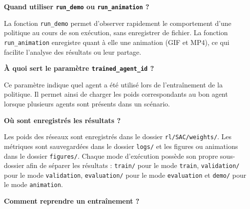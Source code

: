 \vspace{10pt}

\noindent \textbf{Quand utiliser \texttt{run\_demo} ou \texttt{run\_animation} ?}

\vspace{10pt}

\noindent La fonction \texttt{run\_demo} permet d'observer rapidement le comportement d'une politique au cours de son exécution, sans enregistrer de fichier. La fonction \texttt{run\_animation} enregistre quant à elle une animation (GIF et MP4), ce qui facilite l'analyse des résultats ou leur partage.

\vspace{10pt}

\noindent \textbf{À quoi sert le paramètre \texttt{trained\_agent\_id} ?}

\vspace{10pt}

\noindent Ce paramètre indique quel agent a été utilisé lors de l'entraînement de la politique. Il permet ainsi de charger les poids correspondants au bon agent lorsque plusieurs agents sont présents dans un scénario.

\vspace{10pt}

\noindent \textbf{Où sont enregistrés les résultats ?}

\vspace{10pt}

\noindent Les poids des réseaux sont enregistrés dans le dossier \texttt{rl/SAC/weights/}. Les métriques sont sauvegardées dans le dossier \texttt{logs/} et les figures ou animations dans le dossier \texttt{figures/}. Chaque mode d'exécution possède son propre sous-dossier afin de séparer les résultats : \texttt{train/} pour le mode \texttt{train}, \texttt{validation/} pour le mode \texttt{validation}, \texttt{evaluation/} pour le mode \texttt{evaluation} et \texttt{demo/} pour le mode \texttt{animation}.

\vspace{10pt}

\noindent \textbf{Comment reprendre un entraînement ?}

\vspace{10pt}

